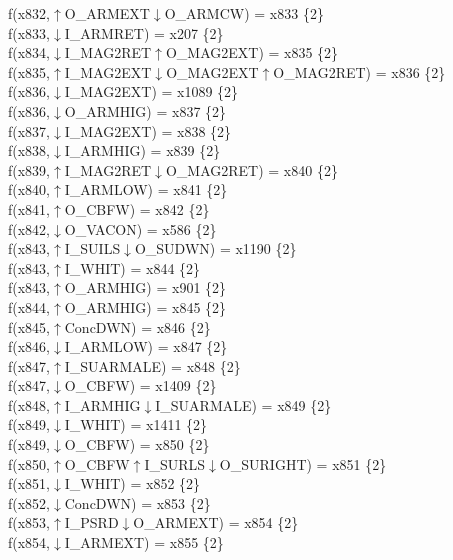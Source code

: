 f(x832,$\uparrow$O\_ARMEXT$\downarrow$O\_ARMCW) = x833 \{2\} \\  
f(x833,$\downarrow$I\_ARMRET) = x207 \{2\} \\  
f(x834,$\downarrow$I\_MAG2RET$\uparrow$O\_MAG2EXT) = x835 \{2\} \\  
f(x835,$\uparrow$I\_MAG2EXT$\downarrow$O\_MAG2EXT$\uparrow$O\_MAG2RET) = x836 \{2\} \\  
f(x836,$\downarrow$I\_MAG2EXT) = x1089 \{2\} \\  
f(x836,$\downarrow$O\_ARMHIG) = x837 \{2\} \\  
f(x837,$\downarrow$I\_MAG2EXT) = x838 \{2\} \\  
f(x838,$\downarrow$I\_ARMHIG) = x839 \{2\} \\  
f(x839,$\uparrow$I\_MAG2RET$\downarrow$O\_MAG2RET) = x840 \{2\} \\  
f(x840,$\uparrow$I\_ARMLOW) = x841 \{2\} \\  
f(x841,$\uparrow$O\_CBFW) = x842 \{2\} \\  
f(x842,$\downarrow$O\_VACON) = x586 \{2\} \\  
f(x843,$\uparrow$I\_SUILS$\downarrow$O\_SUDWN) = x1190 \{2\} \\  
f(x843,$\uparrow$I\_WHIT) = x844 \{2\} \\  
f(x843,$\uparrow$O\_ARMHIG) = x901 \{2\} \\  
f(x844,$\uparrow$O\_ARMHIG) = x845 \{2\} \\  
f(x845,$\uparrow$ConcDWN) = x846 \{2\} \\  
f(x846,$\downarrow$I\_ARMLOW) = x847 \{2\} \\  
f(x847,$\uparrow$I\_SUARMALE) = x848 \{2\} \\  
f(x847,$\downarrow$O\_CBFW) = x1409 \{2\} \\  
f(x848,$\uparrow$I\_ARMHIG$\downarrow$I\_SUARMALE) = x849 \{2\} \\  
f(x849,$\downarrow$I\_WHIT) = x1411 \{2\} \\  
f(x849,$\downarrow$O\_CBFW) = x850 \{2\} \\  
f(x850,$\uparrow$O\_CBFW$\uparrow$I\_SURLS$\downarrow$O\_SURIGHT) = x851 \{2\} \\  
f(x851,$\downarrow$I\_WHIT) = x852 \{2\} \\  
f(x852,$\downarrow$ConcDWN) = x853 \{2\} \\  
f(x853,$\uparrow$I\_PSRD$\downarrow$O\_ARMEXT) = x854 \{2\} \\  
f(x854,$\downarrow$I\_ARMEXT) = x855 \{2\} \\  

